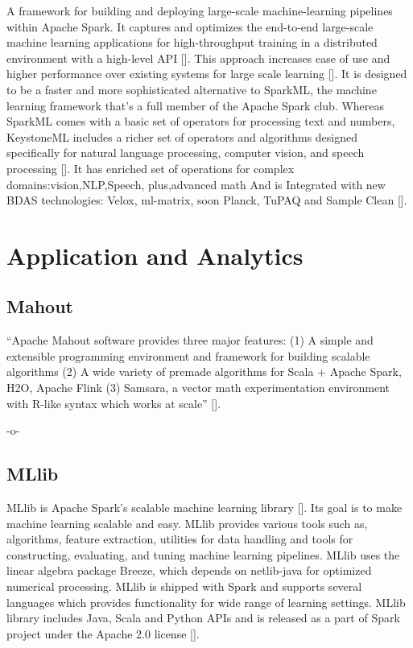 A framework for building and deploying large-scale machine-learning
pipelines within Apache Spark. It captures and optimizes the
end-to-end large-scale machine learning applications for
high-throughput training in a distributed environment with a
high-level API [\cite{sparks2016keystoneml}]. This approach increases
ease of use and higher performance over existing systems for large
scale learning [\cite{sparks2016keystoneml}]. It is designed to be a
faster and more sophisticated alternative to SparkML, the machine
learning framework that's a full member of the Apache Spark
club. Whereas SparkML comes with a basic set of operators for
processing text and numbers, KeystoneML includes a richer set of
operators and algorithms designed specifically for natural language
processing, computer vision, and speech processing [\cite{building}]. It
has enriched set of operations for complex domains:vision,NLP,Speech,
plus,advanced math And is Integrated with new BDAS technologies:
Velox, ml-matrix, soon Planck, TuPAQ and Sample Clean [\cite{spark}].

\section{Application and Analytics}
\label{S:o-application}

\subsection{Mahout}

``Apache Mahout software provides three major features: (1) A simple
and extensible programming environment and framework for building
scalable algorithms (2) A wide variety of premade algorithms for Scala
+ Apache Spark, H2O, Apache Flink (3) Samsara, a vector math
experimentation environment with R-like syntax which works at
scale'' [\cite{www-mahout}].

    -o-


\subsection{MLlib}

MLlib is Apache Spark's scalable machine learning
library [\cite{www-mllib}]. Its goal is to make machine learning
scalable and easy. MLlib provides various tools such as, algorithms,
feature extraction, utilities for data handling and tools for
constructing, evaluating, and tuning machine learning pipelines. MLlib
uses the linear algebra package Breeze, which depends on netlib-java
for optimized numerical processing. MLlib is shipped with Spark and
supports several languages which provides functionality for wide range
of learning settings. MLlib library includes Java, Scala and Python
APIs and is released as a part of Spark project under the Apache 2.0
license [\cite{MLlib-article}].

